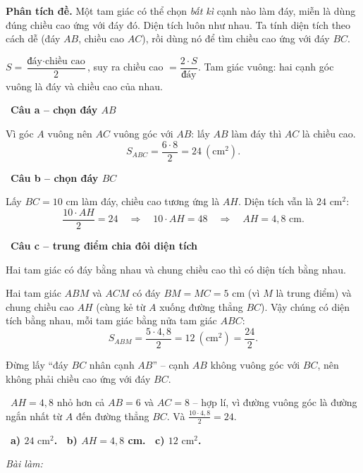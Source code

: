 \documentclass[11pt]{article}
\newif\ifsol \solfalse
\providecommand{\AnsWord}{Đáp số}
\newcommand{\StuProb}[2]{\begin{probboxS}{#1}{#2}\StuProbBody\end{probboxS}}
\newcommand{\ans}[1]{\par\smallskip{\bfseries\color{tmGreen!88!black}\AnsWord:}\ {\bfseries\color{AnsRed}#1}\par}
\newcommand{\probsol}[1]{%
  \begin{lrbox}{\solmeasure}\begin{minipage}{\dimexpr\linewidth-24pt\relax}#1\end{minipage}\end{lrbox}%
  \ifsol
    \begin{solbox}#1\end{solbox}%
  \else
    \setlength{\solht}{\dimexpr\ht\solmeasure+\dp\solmeasure+0.85cm\relax}%
    \ifdim\solht<1.35cm\setlength{\solht}{1.35cm}\fi
    \ifdim\solht>\StudentMaxWork\setlength{\solht}{\StudentMaxWork}\fi
    \par\noindent\begin{minipage}{\linewidth}%
    \expandafter\StuProb\StuProbArgs
    \begin{tcolorbox}[colback=white,colframe=Line,boxrule=0.8pt,arc=5pt,
      left=8pt,right=8pt,top=4pt,bottom=4pt,height=\solht]{\footnotesize\color{Slate}\itshape\WorkWord}\end{tcolorbox}%
    \end{minipage}\par\medskip
  \fi}
\newlength{\StudentMaxWork}\setlength{\StudentMaxWork}{4.5cm}
\newcommand{\step}[2]{\par\smallskip\noindent{\bfseries\color{tmBlue!85!black}\StepWord~#1.}\ {\bfseries #2}\par\nopagebreak}
\newcommand{\verify}[1]{\par\smallskip\noindent{\bfseries\color{tmGreen!80!black}\faCheckCircle\ \CheckWord}\ #1\par}
\def\WorkWord{Bài làm:}
\def\AnsWord{Đáp số}
\def\StepWord{Bước}
\def\CheckWord{Thử lại:}
\begin{document}
\probsol{
\textbf{Phân tích đề.} Một tam giác có thể chọn \emph{bất kì} cạnh nào làm đáy, miễn là dùng đúng chiều cao ứng với đáy đó. Diện tích luôn như nhau. Ta tính diện tích theo cách dễ (đáy $AB$, chiều cao $AC$), rồi dùng nó để tìm chiều cao ứng với đáy $BC$.
\begin{recallbox}$S=\dfrac{\text{đáy}\cdot\text{chiều cao}}{2}$, suy ra chiều cao $=\dfrac{2\cdot S}{\text{đáy}}$. Tam giác vuông: hai cạnh góc vuông là đáy và chiều cao của nhau.\end{recallbox}
\step{1}{Câu a -- chọn đáy $AB$}
Vì góc $A$ vuông nên $AC$ vuông góc với $AB$: lấy $AB$ làm đáy thì $AC$ là chiều cao.
\[ S_{ABC}=\frac{6\cdot8}{2}=24\ (\text{cm}^2). \]

\step{2}{Câu b -- chọn đáy $BC$}
Lấy $BC=10$ cm làm đáy, chiều cao tương ứng là $AH$. Diện tích vẫn là $24\text{ cm}^2$:
\[ \frac{10\cdot AH}{2}=24\quad\Rightarrow\quad 10\cdot AH=48\quad\Rightarrow\quad AH=4{,}8\text{ cm}. \]

\step{3}{Câu c -- trung điểm chia đôi diện tích}
\begin{recallbox}Hai tam giác có đáy bằng nhau và chung chiều cao thì có diện tích bằng nhau.\end{recallbox}
Hai tam giác $ABM$ và $ACM$ có đáy $BM=MC=5$ cm (vì $M$ là trung điểm) và chung chiều cao $AH$ (cùng kẻ từ $A$ xuống đường thẳng $BC$). Vậy chúng có diện tích bằng nhau, mỗi tam giác bằng nửa tam giác $ABC$:
\[ S_{ABM}=\frac{5\cdot4{,}8}{2}=12\ (\text{cm}^2)=\frac{24}{2}. \]
\begin{warnbox}Đừng lấy ``đáy $BC$ nhân cạnh $AB$'' -- cạnh $AB$ không vuông góc với $BC$, nên không phải chiều cao ứng với đáy $BC$.\end{warnbox}
\verify{$AH=4{,}8$ nhỏ hơn cả $AB=6$ và $AC=8$ -- hợp lí, vì đường vuông góc là đường ngắn nhất từ $A$ đến đường thẳng $BC$. Và $\frac{10\cdot4{,}8}{2}=24$.}
\ans{a) $24\text{ cm}^2$. \ b) $AH=4{,}8$ cm. \ c) $12\text{ cm}^2$.}
}

\providecommand{\tbGrid}[4]{\begin{tikzpicture}[baseline=0.2cm,x=0.5cm,y=0.5cm]
  \draw[Ink,line width=0.7pt] (0,0) grid[step=1] (2,2);
  \node[font=\sffamily\bfseries,text=tmBlue!80!black,inner sep=0pt,#4] at (#1,#2) {#3};\end{tikzpicture}}
\providecommand{\rvbbG}[6]{\draw[Ink,line width=0.7pt] (#1,#2) rectangle ++(1,1)
  ({#1+0.5},#2)--++(0,1) (#1,{#2+0.5})--++(1,0);
  \node[font=\sffamily\bfseries,text=tmBlue!80!black,inner sep=0pt,#6] at ({#1+#3},{#2+#4}) {#5};}
\end{document}
